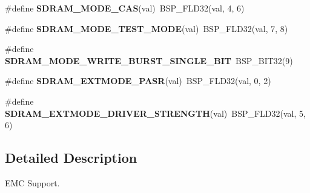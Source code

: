 \begin{DoxyCompactItemize}
$$\item 
\mbox{\label{group__lpc__emc_ga9b0d843ff3aac63699da4e148309b670}} 
\#define {\bfseries S\+D\+R\+A\+M\+\_\+\+M\+O\+D\+E\+\_\+\+C\+AS}(val)~B\+S\+P\+\_\+\+F\+L\+D32(val, 4, 6)
\item 
\mbox{\label{group__lpc__emc_gae6e59a929811a023a841a90ccb91e31a}} 
\#define {\bfseries S\+D\+R\+A\+M\+\_\+\+M\+O\+D\+E\+\_\+\+T\+E\+S\+T\+\_\+\+M\+O\+DE}(val)~B\+S\+P\+\_\+\+F\+L\+D32(val, 7, 8)
\item 
\mbox{\label{group__lpc__emc_ga7d27b28dda89001185254511b7948f6f}} 
\#define {\bfseries S\+D\+R\+A\+M\+\_\+\+M\+O\+D\+E\+\_\+\+W\+R\+I\+T\+E\+\_\+\+B\+U\+R\+S\+T\+\_\+\+S\+I\+N\+G\+L\+E\+\_\+\+B\+IT}~B\+S\+P\+\_\+\+B\+I\+T32(9)
\item 
\mbox{\label{group__lpc__emc_ga247702055e1bb87b4685bb0e28fd5a9f}} 
\#define {\bfseries S\+D\+R\+A\+M\+\_\+\+E\+X\+T\+M\+O\+D\+E\+\_\+\+P\+A\+SR}(val)~B\+S\+P\+\_\+\+F\+L\+D32(val, 0, 2)
\item 
\mbox{\label{group__lpc__emc_gaebf1cbf656937ea9c8b4e64e2750dc76}} 
\#define {\bfseries S\+D\+R\+A\+M\+\_\+\+E\+X\+T\+M\+O\+D\+E\+\_\+\+D\+R\+I\+V\+E\+R\+\_\+\+S\+T\+R\+E\+N\+G\+TH}(val)~B\+S\+P\+\_\+\+F\+L\+D32(val, 5, 6)
\end{DoxyCompactItemize}


\subsection{Detailed Description}
E\+MC Support. 

